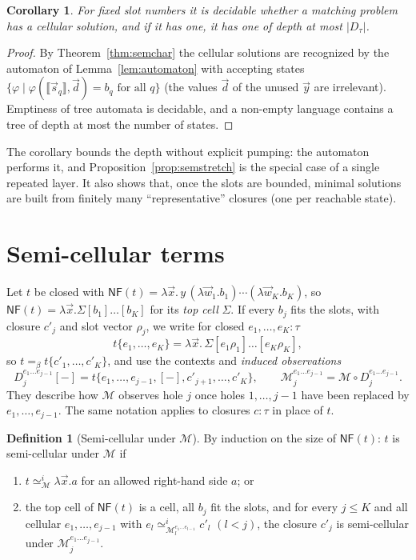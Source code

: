 \documentclass[11pt]{article}
\newcommand{\NF}{\mathsf{NF}\xspace}
\newcommand{\ObsEq}{\mathrel{\simeq}\xspace}
\newcommand{\mcell}{\Sigma}
\newcommand{\sem}[1]{\llbracket #1\rrbracket}
\newtheorem{corollary}[theorem]{Corollary}
\theoremstyle{definition}
\newtheorem{definition}[theorem]{Definition}
\begin{document}
\begin{corollary}\label{cor:cellular-decidable}
For fixed slot numbers it is decidable whether a matching problem has a
cellular solution, and if it has one, it has one of depth at most
$|D_\tau|$.
\end{corollary}
\begin{proof}
By Theorem~\ref{thm:semchar} the cellular solutions are recognized by the
automaton of Lemma~\ref{lem:automaton} with accepting states
$\{\varphi\mid\varphi(\sem{\vec s_q},\vec d)=b_q\text{ for all }q\}$
(the values $\vec d$ of the unused $\vec y$ are irrelevant).  Emptiness
of tree automata is decidable, and a non-empty language contains a tree
of depth at most the number of states.
\end{proof}

The corollary bounds the depth without explicit pumping: the automaton
performs it, and Proposition~\ref{prop:semstretch} is the special case of
a single repeated layer.  It also shows that, once the slots are bounded,
minimal solutions are built from finitely many ``representative'' closures
(one per reachable state).

\section{Semi-cellular terms}\label{sec:semicell}

Let $t$ be closed with
$\NF(t)=\lambda\vec x.\,y\,(\lambda\vec w_1.b_1)\cdots(\lambda\vec w_K.b_K)$,
so $\NF(t)=\lambda\vec x.\mcell[b_1]\ldots[b_K]$ for its \emph{top cell}
$\mcell$.  If every $b_j$ fits the slots, with closure $c'_j$ and slot
vector $\rho_j$, we write for closed $e_1,\ldots,e_K:\tau$
\[
  t\{e_1,\ldots,e_K\}=\lambda\vec x.\,\mcell[e_1\rho_1]\ldots[e_K\rho_K],
\]
so $t=_\beta t\{c'_1,\ldots,c'_K\}$, and use the contexts and
\emph{induced observations}
\[
  D_j^{e_1\ldots e_{j-1}}[-]=t\{e_1,\ldots,e_{j-1},[-],c'_{j+1},\ldots,c'_K\},
  \qquad
  \mathcal M_j^{e_1\ldots e_{j-1}}=\mathcal M\circ D_j^{e_1\ldots e_{j-1}}.
\]
They describe how $\mathcal M$ observes hole $j$ once holes
$1,\ldots,j-1$ have been replaced by $e_1,\ldots,e_{j-1}$.  The same
notation applies to closures $c:\tau$ in place of $t$.

\begin{definition}[Semi-cellular under $\mathcal M$]\label{def:semicell}
By induction on the size of $\NF(t)$: $t$ is semi-cellular under
$\mathcal M$ if
\begin{enumerate}[label=(\roman*)]
\item $t\ObsEq^i_{\mathcal M}\lambda\vec x.a$ for an allowed right-hand
  side $a$; or
\item the top cell of $\NF(t)$ is a cell, all $b_j$ fit the slots, and for
  every $j\le K$ and all cellular $e_1,\ldots,e_{j-1}$ with
  $e_l\ObsEq^i_{\mathcal M_l^{e_1\ldots e_{l-1}}}c'_l$ $(l<j)$, the closure
  $c'_j$ is semi-cellular under $\mathcal M_j^{e_1\ldots e_{j-1}}$.
\end{enumerate}
\end{definition}
\end{document}
